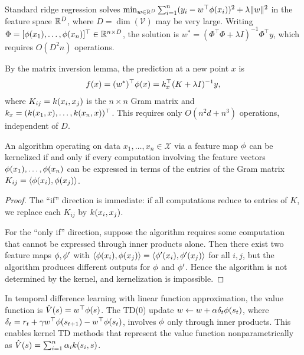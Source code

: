 \documentclass[11pt,a4paper]{article}
\begin{document}
\begin{example}
\label{ex:kernel-ridge}
Standard ridge regression solves
$\min_{w \in \mathbb{R}^D} \sum_{i=1}^n (y_i - w^\top \phi(x_i))^2
+ \lambda \|w\|^2$
in the feature space $\mathbb{R}^D$, where $D = \dim(\mathcal{V})$ may be
very large. Writing $\Phi = [\phi(x_1), \ldots, \phi(x_n)]^\top
\in \mathbb{R}^{n \times D}$, the solution is $w^* = (\Phi^\top \Phi +
\lambda I)^{-1} \Phi^\top y$, which requires $O(D^2 n)$ operations.

By the matrix inversion lemma, the prediction at a new point $x$ is
\[
f(x) = (w^*)^\top \phi(x) = k_x^\top (K + \lambda I)^{-1} y,
\]
where $K_{ij} = k(x_i, x_j)$ is the $n \times n$ Gram matrix
and $k_x = (k(x_1, x), \ldots, k(x_n, x))^\top$.
This requires only $O(n^2 d + n^3)$ operations, independent of $D$.
\end{example}

\begin{proposition}
\label{prop:kernelization}
An algorithm operating on data $x_1, \ldots, x_n \in \mathcal{X}$
via a feature map $\phi$ can be kernelized if and only if every
computation involving the feature vectors $\phi(x_1), \ldots,
\phi(x_n)$ can be expressed in terms of the entries of the
Gram matrix $K_{ij} = \langle \phi(x_i), \phi(x_j) \rangle$.
\end{proposition}

\begin{proof}
The ``if'' direction is immediate: if all computations reduce to
entries of $K$, we replace each $K_{ij}$ by $k(x_i, x_j)$.

For the ``only if'' direction, suppose the algorithm requires some
computation that cannot be expressed through inner products alone.
Then there exist two feature maps $\phi, \phi'$ with
$\langle \phi(x_i), \phi(x_j) \rangle = \langle
\phi'(x_i), \phi'(x_j) \rangle$ for all $i, j$, but the
algorithm produces different outputs for $\phi$ and $\phi'$.
Hence the algorithm is not determined by the kernel, and kernelization
is impossible.
\end{proof}

\begin{rlconnection}[title={The Kernel Trick in RL}]
In temporal difference learning with linear function approximation,
the value function is $\hat{V}(s) = w^\top \phi(s)$. The
TD(0) update $w \leftarrow w + \alpha \delta_t \phi(s_t)$, where
$\delta_t = r_t + \gamma w^\top \phi(s_{t+1}) - w^\top
\phi(s_t)$, involves $\phi$ only through inner products.
This enables kernel TD methods that represent the value function
nonparametrically as $\hat{V}(s) = \sum_{i=1}^n \alpha_i
k(s_i, s)$.
\end{rlconnection}
\end{document}
